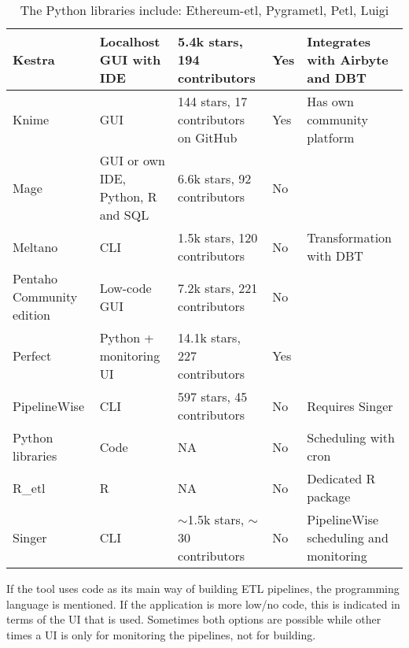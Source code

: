 \documentclass[11pt]{article}
\begin{document}
\begin{table}[H]
\begin{tabular}[c]{|p{2cm}|p{4cm}|p{4cm}|p{1.5cm}|p{4cm}|}
    Kestra & Localhost GUI with IDE & 5.4k stars, 194 contributors & Yes & Integrates with Airbyte and DBT \\ \hline
    Knime & GUI & 144 stars, 17 contributors on GitHub & Yes & Has own community platform \\ \hline
    Mage & GUI or own IDE, Python, R and SQL & 6.6k stars, 92 contributors & No &  \\ \hline
    Meltano & CLI & 1.5k stars, 120 contributors & No & Transformation with DBT \\ \hline
    Pentaho Community edition & Low-code GUI & 7.2k stars, 221 contributors & No &  \\ \hline
    Perfect & Python + monitoring UI & 14.1k stars, 227 contributors & Yes &  \\ \hline
    PipelineWise & CLI & 597 stars, 45 contributors & No & Requires Singer \\ \hline
    Python libraries\text{*} & Code & NA & No & Scheduling with cron \\ \hline
    R\_etl & R & NA & No & Dedicated R package \\ \hline
    Singer & CLI & $\sim$1.5k stars, $\sim$30 contributors & No & PipelineWise scheduling and monitoring \\ \hline
    \end{tabular}
    \caption{\text{*}The Python libraries include: Ethereum-etl, Pygrametl, Petl, Luigi}
\end{table}

If the tool uses code as its main way of building ETL pipelines, the programming language is mentioned. If the application is more low/no code, this is indicated in terms of the UI that is used. Sometimes both options are possible while other times a UI is only for monitoring the pipelines, not for building.
\end{document}
